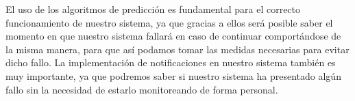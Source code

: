 El uso de los algoritmos de predicción es fundamental para el correcto funcionamiento de nuestro sistema, ya que gracias a ellos será posible saber el momento en que nuestro sistema fallará en caso de continuar comportándose de la misma manera, para que así podamos tomar las medidas necesarias para evitar dicho fallo.
\newline
La implementación de notificaciones en nuestro sistema también es muy importante, ya que podremos saber si nuestro sistema ha presentado algún fallo sin la necesidad de estarlo monitoreando de forma personal.
